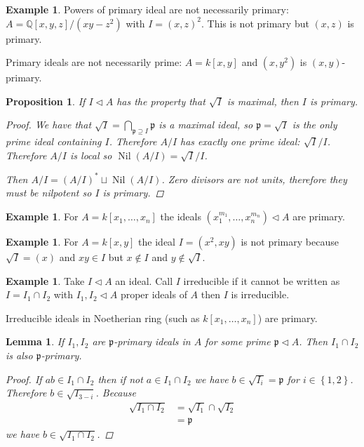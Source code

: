 \documentclass{article}
\newcommand{\Q}{\mathbb{Q}}
\newcommand{\set}[1]{\left\{#1\right\}}
\DeclareMathOperator{\Nil}{Nil}
\newcommand{\primeid}{\mathfrak{p}}
\newcommand{\ideal}{\triangleleft}
\newtheorem{lemma}[theorem]{Lemma}
\newtheorem{proposition}[theorem]{Proposition}
\theoremstyle{definition}
\newtheorem{example}[theorem]{Example}
\begin{document}
\begin{example}
    Powers of primary ideal are not necessarily primary:
    \(A=\Q[x,y,z]/(xy-z^{2})\) with \(I=(x,z)^{2}\). This is not primary but
    \((x,z)\) is primary.

    Primary ideals are not necessarily prime: \(A=k[x,y]\) and \((x,y^{2})\) is
    \((x,y)\)-primary.
\end{example}

\begin{proposition}
    If \(I\ideal A\) has the property that \(\sqrt{I}\) is maximal, then \(I\)
    is primary.

    \begin{proof}
        We have that \(\sqrt{I}=\bigcap_{\primeid\supseteq I}\primeid\) is a
        maximal ideal, so \(\primeid=\sqrt{I}\) is the only prime ideal
        containing \(I\). Therefore \(A/I\) has exactly one prime ideal:
        \(\sqrt{I}/I\). Therefore \(A/I\) is local so \(\Nil(A/I)=\sqrt{I}/I\).

        Then \(A/I=(A/I)^{*}\sqcup\Nil(A/I)\). Zero divisors are not units,
        therefore they must be nilpotent so \(I\) is primary.
    \end{proof}
\end{proposition}

\begin{example}
    For \(A=k[x_{1},\ldots,x_{n}]\) the ideals
    \((x_{1}^{m_{1}},\ldots,x_{n}^{m_{n}})\ideal A\) are primary.
\end{example}

\begin{example}
    For \(A=k[x,y]\) the ideal \(I=(x^{2},xy)\) is not primary because
    \(\sqrt{I}=(x)\) and \(xy\in I\) but \(x\notin I\) and
    \(y\notin\sqrt{I}\).
\end{example}

\begin{example}
    Take \(I\ideal A\) an ideal. Call \(I\) irreducible if it cannot be written
    as \(I=I_{1}\cap I_{2}\) with \(I_{1},I_{2}\ideal A\) proper ideals of \(A\)
    then \(I\) is irreducible.

    Irreducible ideals in Noetherian ring (such as \(k[x_{1},\ldots,x_{n}]\))
    are primary.
\end{example}

\begin{lemma}
    If \(I_{1},I_{2}\) are \(\primeid\)-primary ideals in \(A\) for some prime
    \(\primeid\ideal A\). Then \(I_{1}\cap I_{2}\) is also \(\primeid\)-primary.

    \begin{proof}
        If \(ab\in I_{1}\cap I_{2}\) then if not \(a\in I_{1}\cap I_{2}\) we
        have \(b\in\sqrt{I_{i}}=\primeid\) for \(i\in\set{1,2}\). Therefore
        \(b\in\sqrt{I_{3-i}}\). Because
        \begin{align*}
            \sqrt{I_{1}\cap I_{2}} & =\sqrt{I_{1}}\cap\sqrt{I_{2}} \\
                                   & =\primeid
        \end{align*}
        we have \(b\in\sqrt{I_{1}\cap I_{2}}\).
    \end{proof}
\end{lemma}
\end{document}
